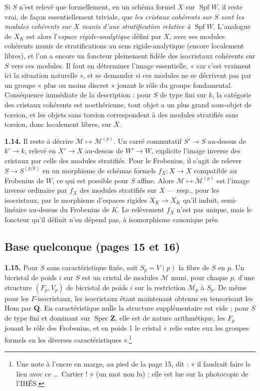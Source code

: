 \documentclass[11pt,a4paper]{article}
\begin{document}
Si $S$ n'est relevé que formellement, en un schéma formel $X$ sur
$\operatorname{Spf}W$, il reste vrai, de façon essentiellement triviale, que
\emph{les cristaux cohérents sur $S$ sont les modules cohérents sur $X$ munis
d'une stratification relative à $\operatorname{Spf}W$}. L'analogue de $X_K$ est
alors l'\emph{espace rigide-analytique} défini par $X$, avec ses modules
cohérents munis de stratifications au sens rigide-analytique (encore
localement libres), et l'on a encore un foncteur pleinement fidèle des
isocristaux cohérents sur $S$ vers ces modules. Il faut en déterminer l'image
essentielle, « car c'est vraiment ici la situation naturelle », et se demander
si ces modules ne se décrivent pas par un groupe « plus ou moins discret »
jouant le rôle du groupe fondamental. Conséquence immédiate de la
description : pour $S$ de type fini sur $k$, la catégorie des cristaux
cohérents est noethérienne, tout objet a un plus grand sous-objet de torsion,
et les objets sans torsion correspondent à des modules stratifiés sans
torsion, donc localement libres, sur $X$.

\textbf{1.14.} Il reste à décrire $\mathcal{M} \mapsto \mathcal{M}^{(p)}$. Un
carré commutatif $S' \to S$ au-dessus de $k' \to k$, relevé en $X' \to X$
au-dessus de $W' \to W$, explicite l'image inverse des cristaux par celle des
modules stratifiés. Pour le Frobenius, il s'agit de relever $S \to S^{(p/k)}$
en un morphisme de schémas formels
$f_X : X \to X$ compatible au Frobenius de $W$, ce qui est possible pour $S$
affine. Alors $\mathcal{M} \mapsto \mathcal{M}^{(p)}$ est l'image inverse
ordinaire par $f_X$ des modules stratifiés sur $X$ — resp., pour les
isocristaux, par le morphisme d'espaces rigides $X_K \to X_K$ qu'il induit,
semi-linéaire au-dessus du Frobenius de $K$. Le relèvement $f_X$ n'est pas
unique, mais le foncteur qu'il définit n'en dépend pas, à isomorphisme
canonique près.

\subsection*{Base quelconque (pages 15 et 16)}

\textbf{1.15.} Pour $S$ sans caractéristique fixée, soit $S_p = V(p)$ la fibre
de $S$ en $p$. Un bicristal de poids $i$ sur $S$ est un cristal de modules
$\mathcal{M}$ muni, pour chaque $p$, d'une structure $(F_p, V_p)$ de bicristal
de poids $i$ sur la restriction $\mathcal{M}_p$ à $S_p$. De même pour les
$F$-isocristaux, les isocristaux étant maintenant obtenus en tensorisant les
$\mathrm{Hom}$ par $\mathbf{Q}$. En caractéristique nulle la structure
supplémentaire est vide ; pour $S$ de type fini et dominant sur
$\operatorname{Spec}\mathbf{Z}$, elle est de nature arithmétique, les $F_p$
jouant le rôle des Frobenius, et en poids 1 le cristal « relie entre eux les
groupes formels en les diverses caractéristiques ».\footnote{Une note à
l'encre en marge, au pied de la page 15, dit : « il faudrait faire le lien
avec ce \ldots\ Cartier ! » (un mot non lu) ; elle est lue sur la
photocopie de l'IHÉS.}
\end{document}
